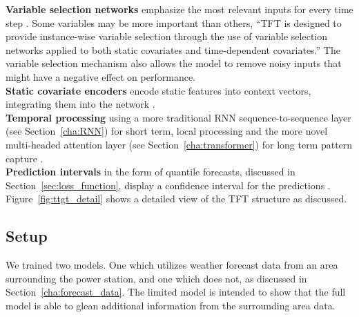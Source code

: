    
    \noindent\textbf{Variable selection networks} emphasize the most relevant inputs for every time step \cite{lim_temporal_2020}. Some variables may be more important than others, \enquote{TFT is designed to provide instance-wise variable selection through the use of variable selection networks applied to both static covariates and time-dependent covariates.} \cite{lim_temporal_2020} The variable selection mechanism also allows the model to remove noisy inputs that might have a negative effect on performance. \\
    \textbf{Static covariate encoders} encode static features into context vectors, integrating them into the network \cite{lim_temporal_2020}.  \\
    \textbf{Temporal processing} using a more traditional RNN sequence-to-sequence layer (see Section~\ref{cha:RNN}) for short term, local processing and the more novel multi-headed attention layer (see Section~\ref{cha:transformer}) for long term pattern capture \cite{lim_temporal_2020}.\\
    \textbf{Prediction intervals} in the form of quantile forecasts, discussed in Section~\ref{sec:loss_function}, display a confidence interval for the predictions \cite{lim_temporal_2020}. \\
    Figure~\ref{fig:ttgt_detail} shows a detailed view of the TFT structure as discussed. 
    

    \subsection{Setup}
    We trained two models. One which utilizes weather forecast data from an area surrounding the power station, and one which does not, as discussed in Section~\ref{cha:forecast_data}. The limited model is intended to show that the full model is able to glean additional information from the surrounding area data.
    
